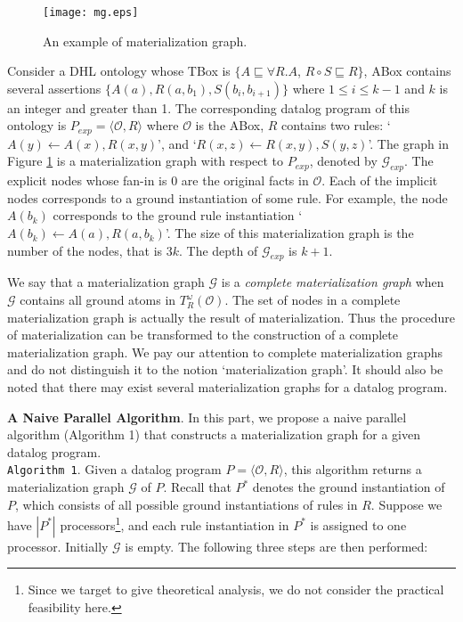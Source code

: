 \documentclass{article}
\begin{document}
\begin{figure}[htbp]
\begin{center}
\texttt{[image: mg.eps]}
\caption{An example of materialization graph.}
\label{fig:mg}
\end{center}
\end{figure}

\begin{example}\label{exp:mg}
Consider a DHL ontology whose TBox is $\{$$A\sqsubseteq\forall R.A$, $R\circ S\sqsubseteq R$$\}$, ABox contains several assertions $\{$$A(a),R(a,b_1),S(b_i,b_{i+1})$$\}$ where $1\leq i\leq k-1$ and $k$ is an integer and greater than 1. The corresponding datalog program of this ontology is $P_{exp}=\langle\mathcal{O}, R\rangle$ where $\mathcal{O}$ is the ABox, $R$ contains two rules: `$A(y)\leftarrow A(x),R(x,y)$', and `$R(x,z)\leftarrow R(x,y),S(y,z)$'. The graph in Figure \ref{fig:mg} is a materialization graph with respect to $P_{exp}$, denoted by $\mathcal{G}_{exp}$. The explicit nodes whose fan-in is 0 are the original facts in $\mathcal{O}$. Each of the implicit nodes corresponds to a ground instantiation of some rule. For example, the node $A(b_k)$ corresponds to the ground rule instantiation `$A(b_k)\leftarrow A(a),R(a,b_k)$'. The size of this materialization graph is the number of the nodes, that is $3k$. The depth of $\mathcal{G}_{exp}$ is $k+1$.
\end{example}

We say that a materialization graph $\mathcal{G}$ is a \emph{complete materialization graph} when $\mathcal{G}$ contains all ground atoms in $T_R^{\omega}(\mathcal{O})$. The set of nodes in a complete materialization graph is actually the result of materialization. Thus the procedure of materialization
can be transformed to the construction of a complete materialization graph. We pay our attention to complete materialization graphs and do not distinguish it to the notion `materialization graph'. It should also be noted that there may exist several materialization graphs for a datalog program.

\textbf{A Naive Parallel Algorithm}. In this part, we propose a naive parallel algorithm (Algorithm 1) that constructs a materialization graph for a given datalog program.\\

\noindent\texttt{Algorithm 1}. Given a datalog program $P=\langle\mathcal{O}, R\rangle$, this algorithm
returns a materialization graph $\mathcal{G}$ of $P$. Recall that $P^*$ denotes the ground instantiation of $P$,
which consists of all possible ground instantiations of rules in $R$. Suppose we have
$|P^*|$ processors\footnote{Since we target to give theoretical analysis, we do not consider the practical feasibility here.}, and each rule instantiation in $P^*$ is assigned to one processor.
Initially $\mathcal{G}$ is empty. The following three steps are then performed:
\end{document}
